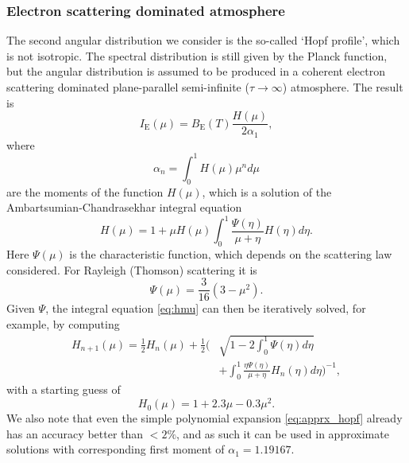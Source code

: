 \documentclass[iop, usenatbib]{emulateapj}
\begin{document}
\subsubsection{Electron scattering dominated atmosphere}

The second angular distribution we consider is the so-called `Hopf profile', which is not isotropic.
The spectral distribution is still given by the Planck function, but the angular distribution is assumed to be produced in a coherent electron scattering dominated plane-parallel semi-infinite ($\tau \rightarrow \infty$) atmosphere.
The result is
\begin{equation}
  I_{\mathrm{E}}(\mu) = B_{\mathrm{E}}(T) \frac{H(\mu)}{2\alpha_1},
\end{equation}
where
\begin{equation}
  \alpha_n = \int_0^1 H(\mu) \mu^n d\mu
\end{equation}
are the moments of the function $H(\mu)$, which is a solution of the Ambartsumian-Chandrasekhar integral equation \citep[see e.g.][]{Cha60,Sob63}
\begin{equation}\label{eq:hmu}
  H(\mu) = 1 + \mu H(\mu) \int_0^1 \frac{\Psi(\eta)}{\mu + \eta} H(\eta) d\eta.
\end{equation}
Here $\Psi(\mu)$ is the characteristic function, which depends on the scattering law considered.
For Rayleigh (Thomson) scattering it is
\begin{equation}
  \Psi(\mu) = \frac{3}{16}(3-\mu^2).
\end{equation}
Given $\Psi$, the integral equation \eqref{eq:hmu} can then be iteratively solved, for example, by computing
\begin{equation}\begin{split}
    H_{n+1}(\mu) =  \frac{1}{2} H_n(\mu) + \frac{1}{2}\Biggl(& \sqrt{1-2\int_0^1 \Psi(\eta)d\eta} \\
                    &+ \int_0^1 \frac{\eta \Psi(\eta)}{\mu + \eta} H_n(\eta) d\eta \Biggr)^{-1},
\end{split}\end{equation}
with a starting guess of
\begin{equation}\label{eq:apprx_hopf}
  H_0(\mu) = 1 + 2.3\mu - 0.3\mu^2.
\end{equation}
We also note that even the simple polynomial expansion \eqref{eq:apprx_hopf} already has an accuracy better than $<2\%$, and as such it can be used in approximate solutions with corresponding first moment of $\alpha_1 = 1.19167$.
\end{document}
